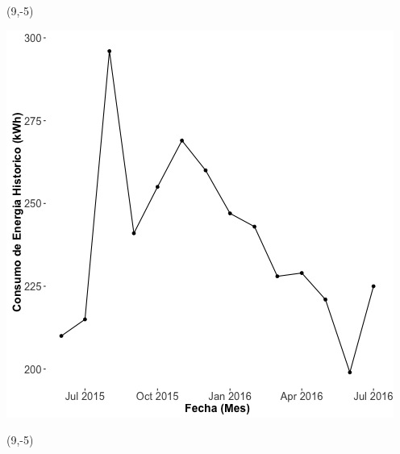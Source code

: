 \documentclass{article}\usepackage[]{graphicx}\usepackage[]{color}
\newenvironment{knitrout}{}{} %
\begin{document}
 \begin{textblock}{1}(9,-5)
\begin{minipage}{20em}
\begingroup

\endgroup
\end{minipage}
\end{textblock}

\begin{knitrout}
\color{fgcolor}
\includegraphics[scale=0.65]{figure/A3_historico_energia} 
\end{knitrout}

 \begin{textblock}{1}(9,-5)
\begin{minipage}{20em}
\begingroup

\endgroup
\end{minipage}
\end{textblock}
\end{document}
